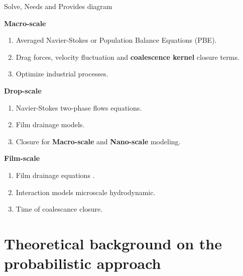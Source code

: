 \documentclass{sintefbeamer}
\begin{document}
\begin{frame}{Solve, Needs and Provides diagram}
  \centering
  	
	\textbf{Macro-scale}
	\begin{enumerate}
		\item Averaged Navier-Stokes or Population Balance Equations (PBE). 
		\item Drag forces, velocity fluctuation and \textbf{coalescence kernel} closure terms. 
		\item Optimize industrial processes. 
	\end{enumerate}

	\textbf{Drop-scale}
	\begin{enumerate}
		\item Navier-Stokes two-phase flows equations. 
		\item Film drainage models.  
		\item Closure for \textbf{Macro-scale} and \textbf{Nano-scale} modeling.  
	\end{enumerate}

	\textbf{Film-scale}
	\begin{enumerate}
		\item Film drainage equations . 
		\item Interaction models microscale hydrodynamic.   
		\item Time of coalescance closure.  
	\end{enumerate}
\end{frame}

\section{Theoretical background on the probabilistic approach}
\end{document}
